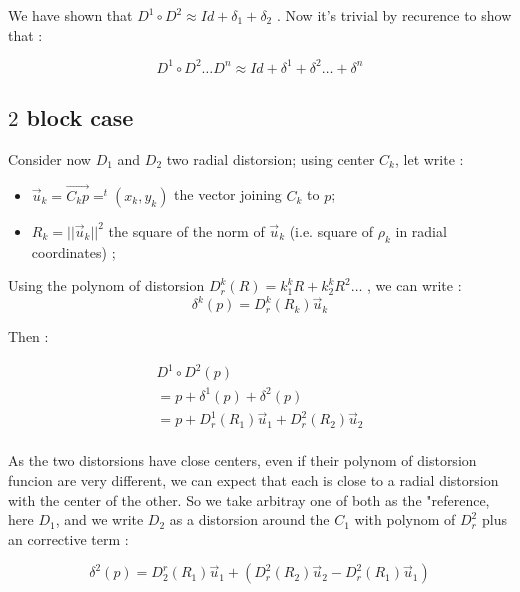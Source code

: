 We have shown that $D^1 \circ D^2  \approx Id + \delta_1 + \delta_2$ .  Now it's trivial by recurence to
show that :

\begin{equation}
     D^1 \circ D^2   \dots D^n  \approx Id + \delta^1 + \delta^2 \dots + \delta^n
\end{equation}


\subsection{$2$ block case}

Consider now $D_1$ and $D_2$ two  radial distorsion; using center $C_k$, let write :

\begin{itemize}
	\item $\vec{u}_k = \overrightarrow{C_k p} = ^t (x_k,y_k) $ the vector joining $C_k$ to $p$;
	\item $R_k = ||\vec{u}_k||^2$  the square of the norm of $\vec{u}_k$ (i.e.  square of $\rho_k$ in radial coordinates) ;
\end{itemize}


Using the polynom  of distorsion $D^k_r(R) = k^k_1 R + k^k_2 R^2  \dots$  , we can write :
\begin{equation}
	\delta^k(p) =   D^k_r(R_k) \vec{u}_k 
\end{equation}

Then :

\begin{equation}
\begin{multlined}
	D^1 \circ D^2 (p)  \\
	= p +\delta^1(p) +\delta^2(p) \\
	= p +    D^1_r(R_1) \vec{u}_1  +  D^2_r(R_2) \vec{u}_2  \\
\end{multlined}
\end{equation}

As the two distorsions have close centers, even if their polynom of distorsion funcion are very different,
we can expect that each is close to a radial distorsion with the center of the other.
So we take arbitray one of both as the "reference, here  $D_1$,
and we write $D_2$ as a distorsion around the $C_1$ with polynom of $D^2_r$  plus an corrective term :

\begin{equation}
	\delta^2(p) =   D^r_2(R_1) \vec{u}_1  + ( D^2_r(R_2) \vec{u}_2 - D^2_r(R_1) \vec{u}_1 )
\end{equation}

